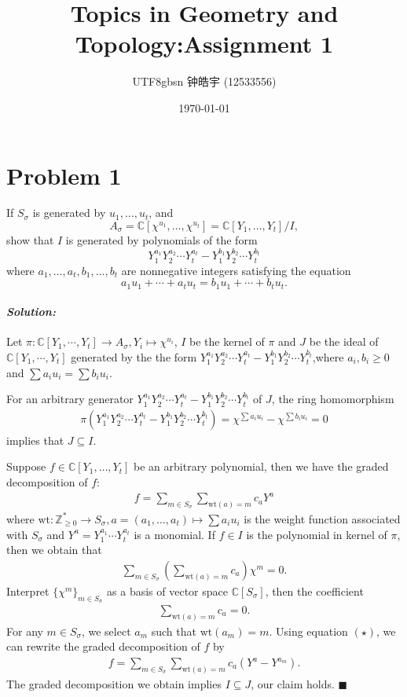 \documentclass[12pt, a4paper]{article}
\title{Topics in Geometry and Topology:Assignment 1}
\author{
    \begin{CJK*}{UTF8}{gbsn}
    钟皓宇 (12533556)
    \end{CJK*}
}
\date{\today}
\newenvironment{solution}
  {\paragraph{\textit{Solution:}}\par\medskip}
  {\hfill$\blacksquare$\vspace{0.1cm}}
\begin{document}
\maketitle
\section*{Problem 1}
If $S_{\sigma}$ is generated by $u_{1}, \dots, u_{t}$, and 
\[
A_{\sigma} = \mathbb{C}[\chi^{u_{1}}, \dots, \chi^{u_{t}}] = \mathbb{C}[Y_{1}, \dots, Y_{t}] / I,
\]
show that $I$ is generated by polynomials of the form
\[
Y_{1}^{a_{1}} Y_{2}^{a_{2}} \cdots Y_{t}^{a_{t}} - Y_{1}^{b_{1}} Y_{2}^{b_{2}} \cdots Y_{t}^{b_{t}}
\]
where $a_{1}, \dots, a_{t}, b_{1}, \dots, b_{t}$ are nonnegative integers satisfying the equation
\[
a_{1}u_{1} + \cdots + a_{t}u_{t} = b_{1}u_{1} + \cdots + b_{t}u_{t}.
\]
\begin{solution}
Let $\pi:\mathbb{C}[Y_1,\cdots,Y_t] \to A_{\sigma}, Y_{i} \mapsto \chi^{u_i}$, $I$ be the kernel of $\pi$ and $J$ be the ideal of $\mathbb{C}[Y_1,\cdots,Y_t]$ generated by the 
the form $Y_{1}^{a_{1}} Y_{2}^{a_{2}} \cdots Y_{t}^{a_{t}} - Y_{1}^{b_{1}} Y_{2}^{b_{2}} \cdots Y_{t}^{b_{t}}$,where $a_i,b_i\ge 0$ and $\sum a_iu_i = \sum b_iu_i$.

For an arbitrary generator $Y_{1}^{a_{1}} Y_{2}^{a_{2}} \cdots Y_{t}^{a_{t}} - Y_{1}^{b_{1}} Y_{2}^{b_{2}} \cdots Y_{t}^{b_{t}}$ of $J$, the ring homomorphism 
\begin{align*}
    \pi(Y_{1}^{a_{1}} Y_{2}^{a_{2}} \cdots Y_{t}^{a_{t}} - Y_{1}^{b_{1}} Y_{2}^{b_{2}} \cdots Y_{t}^{b_{t}}) = \chi^{\sum a_i u_i}- \chi^{\sum b_iu_i} = 0
\end{align*}
implies that $J\subseteq I$.

Suppose $f\in \mathbb{C}[Y_1,\dots,Y_t]$ be an arbitrary polynomial, then we have the graded decomposition of $f$:
\begin{align*}
    f =  \sum_{m\in S_\sigma} \sum_{\text{wt}(a)=m}c_a Y^{a}
\end{align*}
where $\text{wt}:\mathbb{Z}_{\ge 0}^*\to S_{\sigma},a=(a_1,\dots,a_t) \mapsto \sum a_iu_i$ is the weight function associated with $S_\sigma$ and $Y^a = Y_1^{a_1}\cdots Y_t^{a_t}$
is a monomial. If $f\in I$ is the polynomial in kernel of $\pi$, then we obtain that 
\begin{align*}
    \sum_{m\in S_\sigma}
    \left(\sum_{\text{wt}(a)=m}c_a \right)\chi^m = 0.
\end{align*} 
Interpret $\{\chi^m\}_{m\in S_\sigma}$ as a basis of vector space $\mathbb{C}[S_\sigma]$, then the coefficient 
\begin{align*}
    \sum_{\text{wt}(a)=m}c_a =0. \tag{$\star$}
\end{align*}
For any $m\in S_\sigma$, we select $a_{m}$ such that $\text{wt}(a_m)=m$. Using equation $(\star)$, we can rewrite the graded decomposition of $f$ by 
\begin{align*}
    f =  \sum_{m\in S_\sigma} \sum_{\text{wt}(a)=m}c_a (Y^{a}-Y^{a_m}).
\end{align*}
The graded decomposition we obtain implies $I\subseteq J$, our claim holds.
\end{solution}
\end{document}
